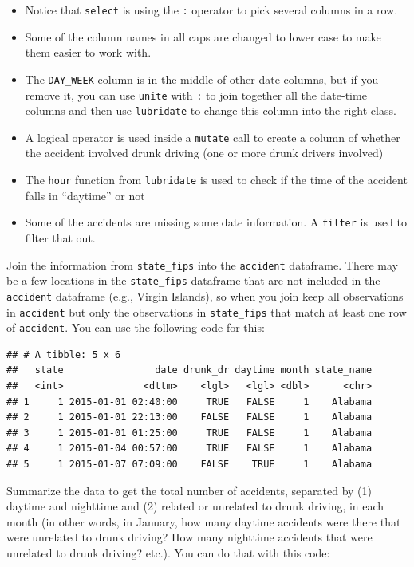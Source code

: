 \documentclass[]{book}
\providecommand{\tightlist}{%
  \setlength{\itemsep}{0pt}\setlength{\parskip}{0pt}}
\theoremstyle{definition}
\theoremstyle{definition}
\theoremstyle{definition}
\theoremstyle{remark}
\begin{document}
\begin{itemize}
\tightlist
\item
  Notice that \texttt{select} is using the \texttt{:} operator to pick
  several columns in a row.
\item
  Some of the column names in all caps are changed to lower case to make
  them easier to work with.
\item
  The \texttt{DAY\_WEEK} column is in the middle of other date columns,
  but if you remove it, you can use \texttt{unite} with \texttt{:} to
  join together all the date-time columns and then use
  \texttt{lubridate} to change this column into the right class.
\item
  A logical operator is used inside a \texttt{mutate} call to create a
  column of whether the accident involved drunk driving (one or more
  drunk drivers involved)
\item
  The \texttt{hour} function from \texttt{lubridate} is used to check if
  the time of the accident falls in ``daytime'' or not
\item
  Some of the accidents are missing some date information. A
  \texttt{filter} is used to filter that out.
\end{itemize}

Join the information from \texttt{state\_fips} into the
\texttt{accident} dataframe. There may be a few locations in the
\texttt{state\_fips} dataframe that are not included in the
\texttt{accident} dataframe (e.g., Virgin Islands), so when you join
keep all observations in \texttt{accident} but only the observations in
\texttt{state\_fips} that match at least one row of \texttt{accident}.
You can use the following code for this:

\begin{verbatim}
## # A tibble: 5 x 6
##   state                date drunk_dr daytime month state_name
##   <int>              <dttm>    <lgl>   <lgl> <dbl>      <chr>
## 1     1 2015-01-01 02:40:00     TRUE   FALSE     1    Alabama
## 2     1 2015-01-01 22:13:00    FALSE   FALSE     1    Alabama
## 3     1 2015-01-01 01:25:00     TRUE   FALSE     1    Alabama
## 4     1 2015-01-04 00:57:00     TRUE   FALSE     1    Alabama
## 5     1 2015-01-07 07:09:00    FALSE    TRUE     1    Alabama
\end{verbatim}

Summarize the data to get the total number of accidents, separated by
(1) daytime and nighttime and (2) related or unrelated to drunk driving,
in each month (in other words, in January, how many daytime accidents
were there that were unrelated to drunk driving? How many nighttime
accidents that were unrelated to drunk driving? etc.). You can do that
with this code:
\end{document}
